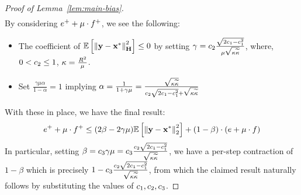 \begin{proof}[Proof of Lemma~\ref{lem:main-bias}]
\begin{align*}
\end{align*}
By considering $e^++\mu\cdot f^+$, we see the following:
\begin{itemize}
\item The coefficient of $\mathbb{E}\left[\left\| \mathbf{y}-\mathbf{x}^* \right\|_{\mathbf{H}}^2\right]\leq 0$ by setting $\gamma = c_2\frac{\sqrt{2c_1-c_1^2}}{\mu\sqrt{{\kappa}\widetilde{\kappa}}}$, where, $0<c_2\leq1$, ${\kappa} = \frac{R^2}{\mu}$.
\item Set $\frac{\gamma\mu\alpha}{1-\alpha}=1$ implying $\alpha = \frac{1}{1+\gamma\mu} = \frac{\sqrt{{\kappa}\widetilde{\kappa}}}{c_2\sqrt{2c_1-c_1^2}+\sqrt{{\kappa}\widetilde{\kappa}}}$
\end{itemize}
With these in place, we have the final result:
\begin{align*}
e^++\mu\cdot f^+ \leq (2\beta-2\gamma\mu)\mathbb{E}\left[\left\| \mathbf{y}-\mathbf{x}^* \right\|_2^2\right] + (1-\beta)\cdot(e+\mu\cdot f)
\end{align*}
In particular, setting $\beta=c_3\gamma\mu=c_3\frac{c_2\sqrt{2c_1-c_1^2}}{\sqrt{{\kappa}\widetilde{\kappa}}}$, we have a per-step contraction of $1-\beta$ which is precisely $1-c_3\frac{c_2\sqrt{2c_1-c_1^2}}{\sqrt{{\kappa}\widetilde{\kappa}}}$, from which the claimed result naturally follows by substituting the values of $c_1,c_2,c_3$.
\end{proof}
